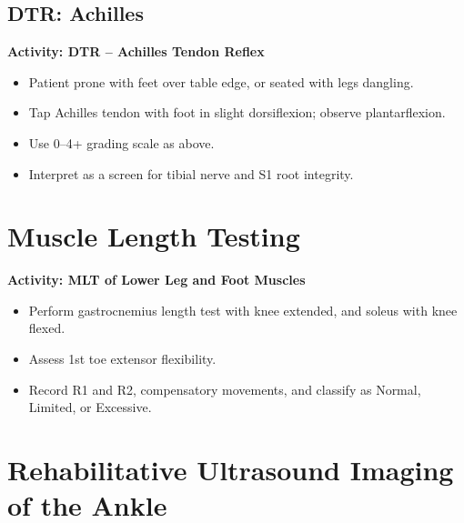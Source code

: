 \subsection*{DTR: Achilles}

\begin{labactivitybox}
\textbf{Activity: DTR – Achilles Tendon Reflex}

\begin{itemize}
  \item Patient prone with feet over table edge, or seated with legs dangling.
  \item Tap Achilles tendon with foot in slight dorsiflexion; observe plantarflexion.
  \item Use 0–4+ grading scale as above.
  \item Interpret as a screen for tibial nerve and S1 root integrity.
\end{itemize}
\end{labactivitybox}

\section*{Muscle Length Testing}

\begin{labactivitybox}
\textbf{Activity: MLT of Lower Leg and Foot Muscles}
\begin{itemize}
  \item Perform gastrocnemius length test with knee extended, and soleus with knee flexed.
  \item Assess 1st toe extensor flexibility.
  \item Record R1 and R2, compensatory movements, and classify as Normal, Limited, or Excessive.
\end{itemize}
\end{labactivitybox}

\section*{Rehabilitative Ultrasound Imaging of the Ankle}

